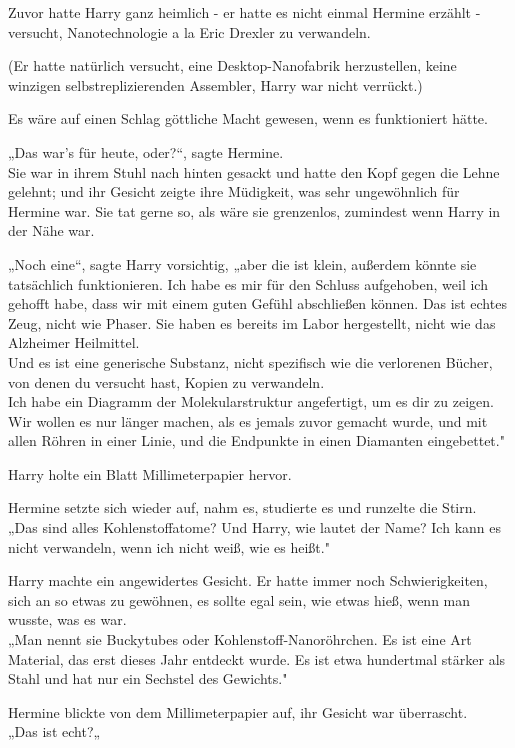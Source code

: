 {Zuvor hatte Harry ganz heimlich - er hatte es nicht einmal Hermine erzählt - versucht, Nanotechnologie a la Eric Drexler zu verwandeln.

(Er hatte natürlich versucht, eine Desktop-Nanofabrik herzustellen, keine winzigen selbstreplizierenden Assembler, Harry war nicht verrückt.)

Es wäre auf einen Schlag göttliche Macht gewesen, wenn es funktioniert hätte.

„Das war's für heute, oder?“, sagte Hermine.\\ Sie war in ihrem Stuhl nach hinten gesackt und hatte den Kopf gegen die Lehne gelehnt; und ihr Gesicht zeigte ihre Müdigkeit, was sehr ungewöhnlich für Hermine war. Sie tat gerne so, als wäre sie grenzenlos, zumindest wenn Harry in der Nähe war.

„Noch eine“, sagte Harry vorsichtig, „aber die ist klein, außerdem könnte sie tatsächlich funktionieren. Ich habe es mir für den Schluss aufgehoben, weil ich gehofft habe, dass wir mit einem guten Gefühl abschließen können. Das ist echtes Zeug, nicht wie Phaser. Sie haben es bereits im Labor hergestellt, nicht wie das Alzheimer Heilmittel.\\ Und es ist eine generische Substanz, nicht spezifisch wie die verlorenen Bücher, von denen du versucht hast, Kopien zu verwandeln.\\ Ich habe ein Diagramm der Molekularstruktur angefertigt, um es dir zu zeigen. Wir wollen es nur länger machen, als es jemals zuvor gemacht wurde, und mit allen Röhren in einer Linie, und die Endpunkte in einen Diamanten eingebettet."

Harry holte ein Blatt Millimeterpapier hervor.

Hermine setzte sich wieder auf, nahm es, studierte es und runzelte die Stirn.\\ „Das sind alles Kohlenstoffatome? Und Harry, wie lautet der Name? Ich kann es nicht verwandeln, wenn ich nicht weiß, wie es heißt."

Harry machte ein angewidertes Gesicht. Er hatte immer noch Schwierigkeiten, sich an so etwas zu gewöhnen, es sollte egal sein, wie etwas hieß, wenn man wusste, was es war.\\ „Man nennt sie Buckytubes oder Kohlenstoff-Nanoröhrchen. Es ist eine Art Material, das erst dieses Jahr entdeckt wurde. Es ist etwa hundertmal stärker als Stahl und hat nur ein Sechstel des Gewichts."

Hermine blickte von dem Millimeterpapier auf, ihr Gesicht war überrascht.\\ „Das ist echt?„

}
